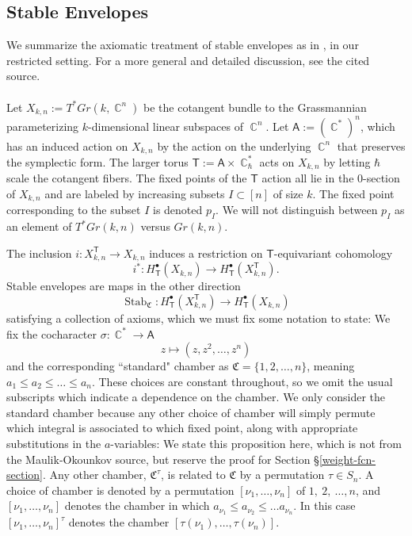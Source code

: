 \documentclass[12 pt]{article}
\theoremstyle{plain}
\theoremstyle{plain}
\theoremstyle{plain}
\theoremstyle{plain}
\theoremstyle{plain}
\theoremstyle{plain}
\theoremstyle{plain}
\theoremstyle{plain}
\theoremstyle{plain}
\theoremstyle{plain}
\theoremstyle{remark}
\theoremstyle{remark}
\theoremstyle{definition}
\theoremstyle{definition}
\theoremstyle{definition}
\theoremstyle{definition}
\theoremstyle{definition}
\theoremstyle{definition}
\DeclareMathOperator{\C}{\mathbb{C}}
\DeclareMathOperator{\stab}{\text{Stab}}
\newcommand{\bT}{\mathsf{T}}
\newcommand{\bA}{\mathsf{A}}
\newcommand{\chamb}{\mathfrak{C}}
\begin{document}
\subsection{Stable Envelopes}\label{stabsection}
We summarize the axiomatic treatment of stable envelopes as in \cite{MO}, in our restricted setting. For a more general and detailed discussion, see the cited source. \\\\
Let $X_{k,n}:=T^*Gr(k,\C^n)$ be the cotangent bundle to the Grassmannian parameterizing $k$-dimensional linear subspaces of $\C^n$. Let $\bA:=(\C^*)^n$, which has an induced action on $X_{k,n}$ by the action on the underlying $\C^n$ that preserves the symplectic form. The larger torus $\bT:=\bA\times \C^*_\hbar$ acts on $X_{k,n}$ by letting $\hbar$ scale the cotangent fibers. The fixed points of the $\bT$ action all lie in the 0-section of $X_{k,n}$ and are labeled by increasing subsets $I\subset [n]$ of size $k$. The fixed point corresponding to the subset $I$ is denoted $p_I$. We will not distinguish between $p_I$ as an element of $T^*Gr(k,n)$ versus $Gr(k,n)$.

The inclusion $i:X_{k,n}^\bT\to X_{k,n}$ induces a restriction on $\bT$-equivariant cohomology
$$
i^*: H_\bT^\bullet(X_{k,n})\to H_\bT^\bullet(X_{k,n}^\bT).
$$
Stable envelopes are  maps in the other direction
$$
\stab_{\mathfrak C}: H^\bullet_\bT(X_{k,n}^\bT)\to H^\bullet_\bT(X_{k,n})
$$
satisfying a collection of axioms, which we must fix some notation to state: We fix the cocharacter $\sigma: \C^*\to\bA$
$$
z\mapsto (z,z^2,\dots,z^n)
$$
and the corresponding ``standard" chamber as $\mathfrak C=\{1,2,\dots,n\}$, meaning $a_1\leq a_2\leq \dots \leq a_n$. These choices are constant throughout, so we omit the usual subscripts which indicate a dependence on the chamber. We only consider the standard chamber because any other choice of chamber will simply permute which integral is associated to which fixed point, along with appropriate substitutions in the $a$-variables: We state this proposition here, which is not from the Maulik-Okounkov source, but reserve the proof for Section \S\ref{weight-fcn-section}. Any other chamber, $\chamb^\tau$, is related to $\chamb$ by a permutation $\tau\in S_n$. A choice of chamber is denoted by a permutation $[\nu_{1},\dots,\nu_{n}]$ of $1,\ 2,\ \dots,n$, and $[\nu_{1},\dots,\nu_{n}]$ denotes the chamber in which $a_{\nu_{1}}\leq a_{\nu_{2}}\leq\dots a_{\nu_{n}}$. In this case $[\nu_{1},\dots,\nu_{n}]^{\tau}$ denotes the chamber $[\tau(\nu_{1}),\dots,\tau(\nu_{n})]$.
\end{document}
